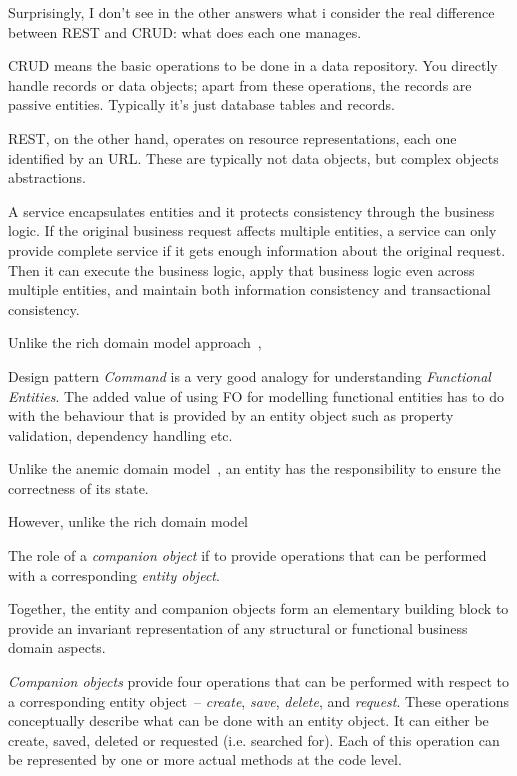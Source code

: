 \documentclass[a4paper,12pt,oneside,openright,final]{memoir} %
\begin{document}
\iffalse


	Surprisingly, I don't see in the other answers what i consider the real difference between REST and CRUD: what does each one manages.

	CRUD means the basic operations to be done in a data repository. You directly handle records or data objects; apart from these operations, the records are passive entities. Typically it's just database tables and records.

	REST, on the other hand, operates on resource representations, each one identified by an URL. These are typically not data objects, but complex objects abstractions.


	
	A service encapsulates entities and it protects consistency through the business logic. 
	If the original business request affects multiple entities, a service can only provide complete service if it gets enough information about the original request.
	Then it can execute the business logic, apply that business logic even across multiple entities, and maintain both information consistency and transactional consistency.
	
	

	Unlike the rich domain model approach~\cite{evans2003},
	
	
	Design pattern \emph{Command} is a very good analogy for understanding \emph{Functional Entities}.
	The added value of using FO for modelling functional entities has to do with the behaviour that is provided by an entity object such as property validation, dependency handling etc.


	Unlike the anemic domain model~\cite{fowler2003}, an entity has the responsibility to ensure the correctness of its state.
	
	However, unlike the rich domain model
	
		
	
  	The role of a \emph{companion object} if to provide operations that can be performed with a corresponding \emph{entity object}.

  	Together, the entity and companion objects form an elementary building block to provide an invariant representation of any structural or functional business domain aspects.

  
  \emph{Companion objects} provide four operations that can be performed with respect to a corresponding entity object~--  \emph{create}, \emph{save}, \emph{delete}, and \emph{request}.
  These operations conceptually describe what can be done with an entity object.
  It can either be create, saved, deleted or requested (i.e. searched for).
  Each of this operation can be represented by one or more actual methods at the code level.
    
\end{document}

